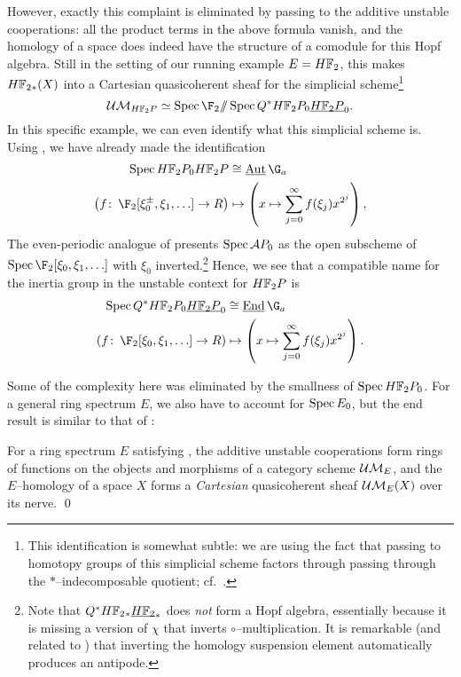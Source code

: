 However, exactly this complaint is eliminated by passing to the additive unstable cooperations: all the product terms in the above formula vanish, and the homology of a space does indeed have the structure of a comodule for this Hopf algebra.  Still in the setting of our running example \(E = \HFtwo\), this makes \(\HFtwo_*(X)\) into a Cartesian quasicoherent sheaf for the simplicial scheme\footnote{This identification is somewhat subtle: we are using the fact that passing to homotopy groups of this simplicial scheme factors through passing through the \(\ast\)--indecomposable quotient; cf.\ .} \[\Ucontext{\HFtwo P} \simeq \Spec \F_2 \mmod \Spec Q^* \HFtwo P_0 \OS{\HFtwo P}{0}.\]  In this specific example, we can even identify what this simplicial scheme is.  Using , we have already made the identification
\begin{align*}
\Spec \HFtwo P_0 \HFtwo P & \cong \InternalAut{\G_a} \\
\left(f\co \F_2[\xi_0^\pm, \xi_1, \ldots] \to R \right) & \mapsto \left(x \mapsto \sum_{j=0}^\infty f(\xi_j) x^{2^j}\right),
\end{align*}
The even-periodic analogue of  presents \(\operatorname{Spec} \mathcal A P_0\) as the open subscheme of \(\Spec \F_2[\xi_0, \xi_1, \ldots]\) with \(\xi_0\) inverted.\footnote{Note that \(Q^* \HFtwo_* \OS{\HFtwo}{*}\) does \emph{not} form a Hopf algebra, essentially because it is missing a version of \(\chi\) that inverts \(\circ\)--multiplication.  It is remarkable (and related to ) that inverting the homology suspension element automatically produces an antipode.}  Hence, we see that a compatible name for the inertia group in the unstable context for \(\HFtwo P\) is
\begin{align*}
\Spec Q^* \HFtwo P_0 \OS{\HFtwo P}{0} & \cong \InternalEnd{\G_a} \\
\left(f\co \F_2[\xi_0, \xi_1, \ldots] \to R \right) & \mapsto \left(x \mapsto \sum_{j=0}^\infty f(\xi_j) x^{2^j}\right).
\end{align*}

Some of the complexity here was eliminated by the smallness of \(\Spec \HFtwo P_0\).  For a general ring spectrum \(E\), we also have to account for \(\operatorname{Spec} E_0\), but the end result is similar to that of :
\begin{lemma}
For a ring spectrum \(E\) satisfying {\UFH}, the additive unstable cooperations form rings of functions on the objects and morphisms of a category scheme \(\mathcal{UM}_{E}\), and the \(E\)--homology of a space \(X\) forms a \emph{Cartesian} quasicoherent sheaf \(\mathcal{UM}_{E}(X)\) over its nerve. \qed
\end{lemma}

